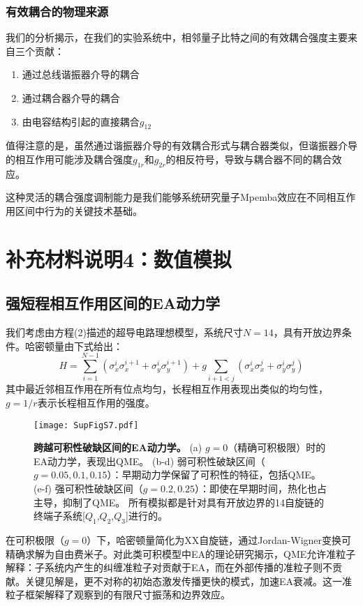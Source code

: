 \documentclass[11pt,a4paper]{article}
\begin{document}
\subsubsection{有效耦合的物理来源}

我们的分析揭示，在我们的实验系统中，相邻量子比特之间的有效耦合强度主要来自三个贡献：
\begin{enumerate}
    \item 通过总线谐振器介导的耦合
    \item 通过耦合器介导的耦合
    \item 由电容结构引起的直接耦合$g_{12}$
\end{enumerate}

值得注意的是，虽然通过谐振器介导的有效耦合形式与耦合器类似，但谐振器介导的相互作用可能涉及耦合强度$g_{1r}$和$g_{2r}$的相反符号，导致与耦合器不同的耦合效应。

这种灵活的耦合强度调制能力是我们能够系统研究量子Mpemba效应在不同相互作用区间中行为的关键技术基础。


\section*{补充材料说明4：数值模拟}

\subsection{强短程相互作用区间的EA动力学}

我们考虑由方程(2)描述的超导电路理想模型，系统尺寸$N=14$，具有开放边界条件。哈密顿量由下式给出：
\[
H = \sum_{i=1}^{N-1} \left(\sigma_x^i \sigma_x^{i+1} + \sigma_y^i \sigma_y^{i+1}\right) + g \sum_{i+1<j} \left(\sigma_x^i \sigma_x^j + \sigma_y^i \sigma_y^j\right)
\]
其中最近邻相互作用在所有位点均匀，长程相互作用表现出类似的均匀性，$g=1/r$表示长程相互作用的强度。

\begin{figure}[H]
    \centering
    \texttt{[image: SupFigS7.pdf]}
    \caption{
        \textbf{跨越可积性破缺区间的EA动力学。}
        (a) $g=0$（精确可积极限）时的EA动力学，表现出QME。
        (b-d) 弱可积性破缺区间（$g=0.05,0.1,0.15$）：早期动力学保留了可积性的特征，包括QME。
        (e-f) 强可积性破缺区间（$g=0.2,0.25$）：即使在早期时间，热化也占主导，抑制了QME。
        所有模拟都是针对具有开放边界的14自旋链的终端子系统[$Q_1$,$Q_2$,$Q_3$]进行的。
    }
    \label{fig:EA_dynamics_integrability}
\end{figure}

在可积极限（$g=0$）下，哈密顿量简化为XX自旋链，通过Jordan-Wigner变换可精确求解为自由费米子。对此类可积模型中EA的理论研究揭示，QME允许准粒子解释：子系统内产生的纠缠准粒子对贡献于EA，而在外部传播的准粒子则不贡献。关键见解是，更不对称的初始态激发传播更快的模式，加速EA衰减。这一准粒子框架解释了观察到的有限尺寸振荡和边界效应。
\end{document}
